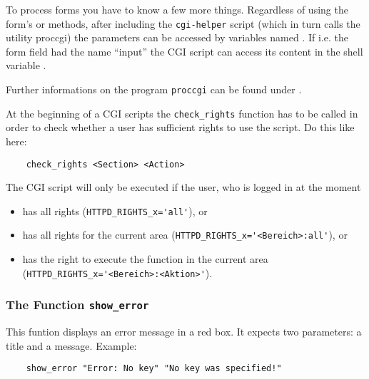 To process forms you have to know a few more things. Regardless of using the
form's  or  methods, after including the \texttt{cgi-helper} script (which in turn calls
the utility proccgi) the parameters can be accessed by variables named . 
If i.e. the form field had the name ``input'' the CGI script can access
its content in the shell variable .

Further informations on the program \texttt{proccgi} can be found under
.


At the beginning of a CGI scripts the \texttt{check\_rights} function
has to be called in order to check whether a user has sufficient rights to use
the script. Do this like here:

\begin{example}
\begin{verbatim}
    check_rights <Section> <Action>
\end{verbatim}
\end{example}

The CGI script will only be executed if the user, who is logged in at the moment
\begin{itemize}
\item has all rights (\verb+HTTPD_RIGHTS_x='all'+), or
\item has all rights for the current area
    (\verb+HTTPD_RIGHTS_x='<Bereich>:all'+), or
\item has the right to execute the function in the current area\\
    (\verb+HTTPD_RIGHTS_x='<Bereich>:<Aktion>'+).
\end{itemize}

\subsubsection{The Function \texttt{show\_error}}

This funtion displays an error message in a red box. It expects two
parameters: a title and a message. Example:

\begin{example}
\begin{verbatim}
    show_error "Error: No key" "No key was specified!"
\end{verbatim}
\end{example}

